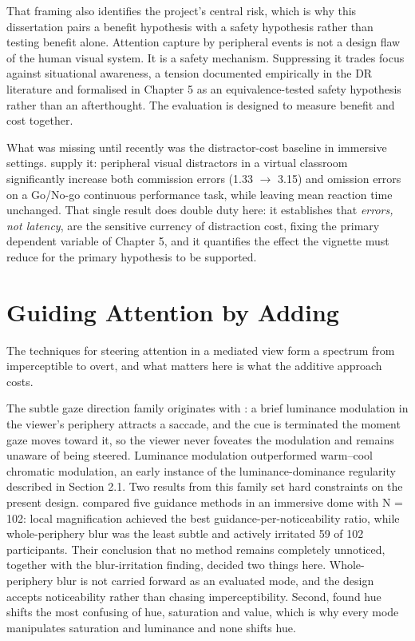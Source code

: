 That framing also identifies the project's central risk, which is why this dissertation pairs a
benefit hypothesis with a safety hypothesis rather than testing benefit alone. Attention capture by
peripheral events is not a design flaw of the human visual system. It is a safety mechanism.
Suppressing it trades focus against situational awareness, a tension documented empirically in the
DR literature \citep{murph2021,mclaughlin2025} and formalised in Chapter 5 as an equivalence-tested
safety hypothesis rather than an afterthought. The evaluation is designed to measure benefit and
cost together.

What was missing until recently was the distractor-cost baseline in immersive settings.
\citet[N = 66]{ai2025} supply it: peripheral visual distractors in a virtual classroom significantly
increase both commission errors (1.33 $\rightarrow$ 3.15) and omission errors on a Go/No-go
continuous performance task, while leaving mean reaction time unchanged. That single result does
double duty here: it establishes that \textit{errors, not latency}, are the sensitive currency of
distraction cost, fixing the primary dependent variable of Chapter 5, and it quantifies the effect
the vignette must reduce for the primary hypothesis to be supported.

\section{Guiding Attention by Adding}

The techniques for steering attention in a mediated view form a spectrum from imperceptible to
overt, and what matters here is what the additive approach costs.

The subtle gaze direction family originates with \citet{bailey2009}: a brief luminance modulation in
the viewer's periphery attracts a saccade, and the cue is terminated the moment gaze moves toward it,
so the viewer never foveates the modulation and remains unaware of being steered. Luminance
modulation outperformed warm--cool chromatic modulation, an early instance of the luminance-dominance
regularity described in Section 2.1. Two results from this family set hard constraints on the present design.
\citet{grogorick2018} compared five guidance methods in an immersive dome with N = 102: local
magnification achieved the best guidance-per-noticeability ratio, while whole-periphery blur was the
least subtle and actively irritated 59 of 102 participants. Their conclusion that no method remains
completely unnoticed, together with the blur-irritation finding, decided two things here.
Whole-periphery blur is not carried forward as an evaluated mode, and the design accepts
noticeability rather than chasing imperceptibility. Second, \citet{erickson2023} found hue shifts the
most confusing of hue, saturation and value, which is why every mode manipulates saturation and
luminance and none shifts hue.

